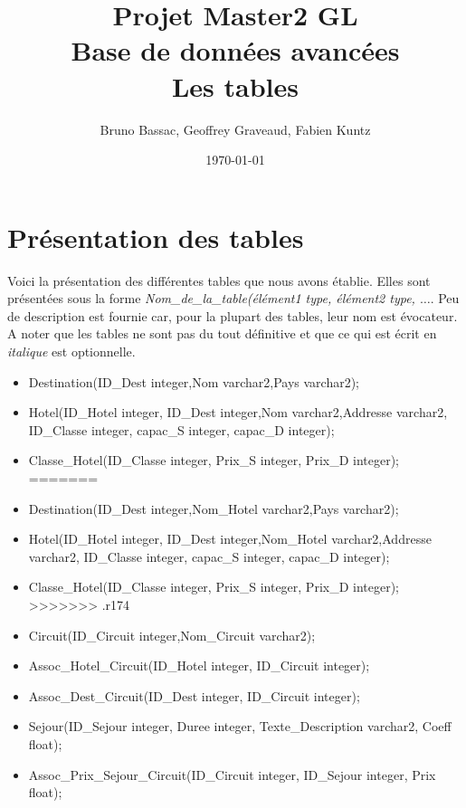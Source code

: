 \documentclass[10pt]{article}
\author{Bruno Bassac, Geoffrey Graveaud, Fabien Kuntz}
\title{\textbf{Projet Master2 GL} \\
\textbf{Base de données avancées} \\
Les tables}
\date{\today}
\begin{document}
\maketitle

\section{Présentation des tables}
Voici la présentation des différentes tables que nous avons établie. Elles sont présentées sous la forme \textit{Nom\_de\_la\_table(élément1 type, élément2 type, $\dots$}. Peu de description est fournie car, pour la plupart des tables, leur nom est évocateur. A noter que les tables ne sont pas du tout définitive et que ce qui est écrit en \textit{italique} est optionnelle.\bigskip

\begin{itemize}
<<<<<<< .mine
\item Destination(ID\_Dest integer,Nom varchar2,Pays varchar2);\\
\item Hotel(ID\_Hotel integer, ID\_Dest integer,Nom varchar2,Addresse varchar2, ID\_Classe integer, capac\_S integer, capac\_D integer);\\
\item Classe\_Hotel(ID\_Classe integer, Prix\_S integer, Prix\_D integer);\\
=======
\item Destination(ID\_Dest integer,Nom_Hotel varchar2,Pays varchar2);\\
\item Hotel(ID\_Hotel integer, ID\_Dest integer,Nom_Hotel varchar2,Addresse varchar2, ID\_Classe integer, capac\_S integer, capac\_D integer);\\
\item Classe\_Hotel(ID\_Classe integer, Prix\_S integer, Prix\_D integer);\\
>>>>>>> .r174
\item Circuit(ID\_Circuit integer,Nom\_Circuit varchar2);\\
\item Assoc\_Hotel\_Circuit(ID\_Hotel integer, ID\_Circuit integer);\\
\item Assoc\_Dest\_Circuit(ID\_Dest integer, ID\_Circuit integer);\\
\item Sejour(ID\_Sejour integer, Duree integer, Texte\_Description varchar2, Coeff float);\\
\item Assoc\_Prix\_Sejour\_Circuit(ID\_Circuit integer, ID\_Sejour integer, Prix float);\\

\end{itemize}
\end{document}

